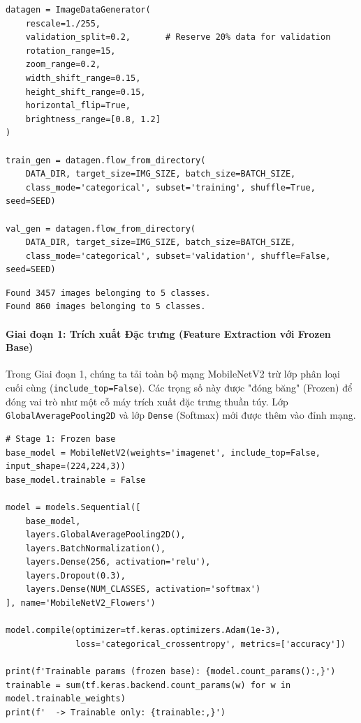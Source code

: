 \begin{lstlisting}[style=pythoncode, caption={Sử dụng ImageDataGenerator tạo các dữ liệu tăng cường}]
datagen = ImageDataGenerator(
    rescale=1./255,
    validation_split=0.2,       # Reserve 20% data for validation
    rotation_range=15,
    zoom_range=0.2,
    width_shift_range=0.15,
    height_shift_range=0.15,
    horizontal_flip=True,
    brightness_range=[0.8, 1.2]
)

train_gen = datagen.flow_from_directory(
    DATA_DIR, target_size=IMG_SIZE, batch_size=BATCH_SIZE,
    class_mode='categorical', subset='training', shuffle=True, seed=SEED)
    
val_gen = datagen.flow_from_directory(
    DATA_DIR, target_size=IMG_SIZE, batch_size=BATCH_SIZE,
    class_mode='categorical', subset='validation', shuffle=False, seed=SEED)
\end{lstlisting}

\begin{lstlisting}[style=consoleoutput, caption={Output: Khởi tạo Generators thành công}]
Found 3457 images belonging to 5 classes.
Found 860 images belonging to 5 classes.
\end{lstlisting}

\paragraph{Giai đoạn 1: Trích xuất Đặc trưng (Feature Extraction với Frozen Base)} \hfill\mbox{}

Trong Giai đoạn 1, chúng ta tải toàn bộ mạng MobileNetV2 trừ lớp phân loại cuối cùng (\texttt{include\_top=False}). Các trọng số này được "đóng băng" (Frozen) để đóng vai trò như một cỗ máy trích xuất đặc trưng thuần túy. Lớp \texttt{GlobalAveragePooling2D} và lớp \texttt{Dense} (Softmax) mới được thêm vào đỉnh mạng.

\begin{lstlisting}[style=pythoncode, caption={Định nghĩa mô hình MobileNetV2 - Đóng băng trọng số}]
# Stage 1: Frozen base
base_model = MobileNetV2(weights='imagenet', include_top=False, input_shape=(224,224,3))
base_model.trainable = False

model = models.Sequential([
    base_model,
    layers.GlobalAveragePooling2D(),
    layers.BatchNormalization(),
    layers.Dense(256, activation='relu'),
    layers.Dropout(0.3),
    layers.Dense(NUM_CLASSES, activation='softmax')
], name='MobileNetV2_Flowers')

model.compile(optimizer=tf.keras.optimizers.Adam(1e-3),
              loss='categorical_crossentropy', metrics=['accuracy'])

print(f'Trainable params (frozen base): {model.count_params():,}')
trainable = sum(tf.keras.backend.count_params(w) for w in model.trainable_weights)
print(f'  -> Trainable only: {trainable:,}')
\end{lstlisting}

